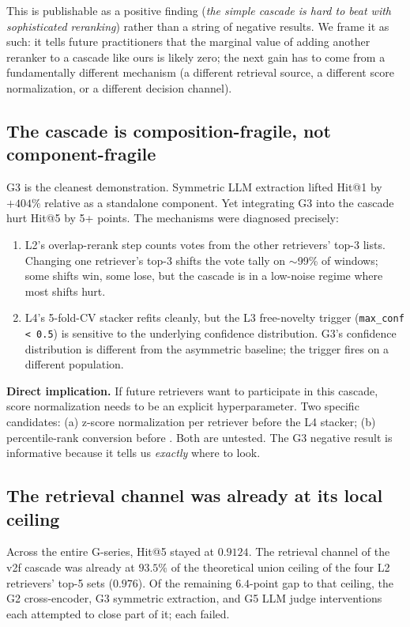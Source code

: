 This is publishable as a positive finding (\emph{the simple cascade is hard to beat with sophisticated reranking}) rather than a string of negative results. We frame it as such: it tells future practitioners that the marginal value of adding another reranker to a cascade like ours is likely zero; the next gain has to come from a fundamentally different mechanism (a different retrieval source, a different score normalization, or a different decision channel).

\subsection{The cascade is composition-fragile, not component-fragile}

G3 is the cleanest demonstration. Symmetric LLM extraction lifted \kgret{} Hit@1 by $+404\%$ relative as a standalone component. Yet integrating G3 into the cascade hurt Hit@5 by 5+ points. The mechanisms were diagnosed precisely:

\begin{enumerate}
\item L2's overlap-rerank step counts votes from the other retrievers' top-3 lists. Changing one retriever's top-3 shifts the vote tally on $\sim$99\% of windows; some shifts win, some lose, but the cascade is in a low-noise regime where most shifts hurt.
\item L4's 5-fold-CV stacker refits cleanly, but the L3 free-novelty trigger (\texttt{max\_conf < 0.5}) is sensitive to the underlying confidence distribution. G3's confidence distribution is different from the asymmetric baseline; the trigger fires on a different population.
\end{enumerate}

\textbf{Direct implication.} If future retrievers want to participate in this cascade, score normalization needs to be an explicit hyperparameter. Two specific candidates: (a) z-score normalization per retriever before the L4 stacker; (b) percentile-rank conversion before \rrf. Both are untested. The G3 negative result is informative because it tells us \emph{exactly} where to look.

\subsection{The retrieval channel was already at its local ceiling}

Across the entire G-series, Hit@5 stayed at $0.9124$. The retrieval channel of the v2f cascade was already at $93.5\%$ of the theoretical union ceiling of the four L2 retrievers' top-5 sets ($0.976$). Of the remaining $6.4$-point gap to that ceiling, the G2 cross-encoder, G3 symmetric extraction, and G5 LLM judge interventions each attempted to close part of it; each failed.

